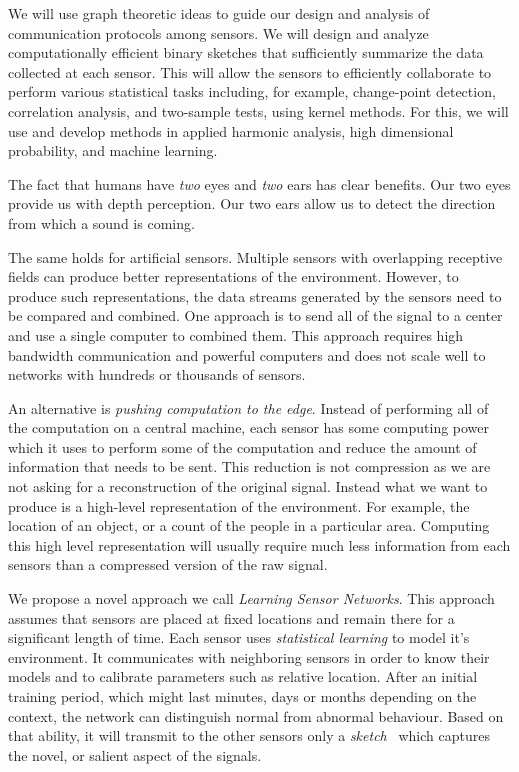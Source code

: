 \documentclass{article}
\begin{document}
We will use graph theoretic ideas to guide our design and analysis of communication protocols among sensors. We will design and analyze computationally efficient binary sketches that sufficiently summarize the data collected at each sensor. This will allow the sensors to efficiently collaborate to perform various statistical tasks including, for example, change-point detection, correlation analysis, and two-sample tests, using kernel methods. For this, we will use and develop methods in applied harmonic analysis, high dimensional probability, and machine learning.   






\iffalse The fact that humans have {\em two} eyes and {\em two} ears has clear
benefits. Our two eyes provide us with depth perception. Our two ears
allow us to detect the direction from which a sound is coming.

The same holds for artificial sensors. Multiple sensors with
overlapping receptive fields can produce better representations of the
environment. However, to produce such representations, the data
streams generated by the sensors need to be compared and combined. One
approach is to send all of the signal to a center and use a single
computer to combined them. This approach requires high bandwidth
communication and powerful computers and does not scale well to
networks with hundreds or thousands of sensors.

An alternative is {\em pushing computation to the edge}. Instead of
performing all of the computation on a central machine, each sensor
has some computing power which it uses to perform some of the
computation and reduce the amount of information that needs to be
sent. This reduction is not compression as we are not asking for a
reconstruction of the original signal. Instead what we want to produce
is a high-level representation of the environment. For example, the
location of an object, or a count of the people in a particular
area. Computing this high level representation will usually require
much less information from each sensors than a compressed version of
the raw signal.

We propose a novel approach we call {\em Learning Sensor Networks}.
This approach assumes that sensors are placed at fixed locations and
remain there for a significant length of time.  Each sensor uses {\em
  statistical learning} to model it's environment. It communicates
with neighboring sensors in order to know their models and to
calibrate parameters such as relative location. After an initial
training period, which might last minutes, days or months depending on
the context, the network can distinguish normal from abnormal
behaviour. Based on that ability, it will transmit to the other
sensors only a {\em sketch}~\cite{rahimi2008random} which captures the novel, or
salient aspect of the signals.
\end{document}
